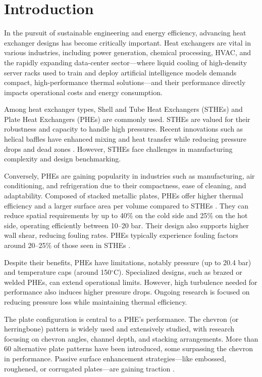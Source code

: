 \documentclass[review,12pt]{elsarticle}
\newcommand{\degree}{\ensuremath{^\circ}}
\begin{document}
\clearpage

\section{Introduction}
\label{sec:introduction}


In the pursuit of sustainable engineering and energy efficiency, advancing heat exchanger designs has become critically important. Heat exchangers are vital in various industries, including power generation, chemical processing, HVAC, and the rapidly expanding data-center sector---where liquid cooling of high-density server racks used to train and deploy artificial intelligence models demands compact, high-performance thermal solutions---and their performance directly impacts operational costs and energy consumption. 

Among heat exchanger types, Shell and Tube Heat Exchangers (STHEs) and Plate Heat Exchangers (PHEs) are commonly used. STHEs are valued for their robustness and capacity to handle high pressures. Recent innovations such as helical baffles have enhanced mixing and heat transfer while reducing pressure drops and dead zones \citep{salahuddin2015}. However, STHEs face challenges in manufacturing complexity and design benchmarking.

Conversely, PHEs are gaining popularity in industries such as manufacturing, air conditioning, and refrigeration due to their compactness, ease of cleaning, and adaptability. Composed of stacked metallic plates, PHEs offer higher thermal efficiency and a larger surface area per volume compared to STHEs \citep{abukhader2012}. They can reduce spatial requirements by up to 40\% on the cold side and 25\% on the hot side, operating efficiently between 10--20 bar. Their design also supports higher wall shear, reducing fouling rates. PHEs typically experience fouling factors around 20--25\% of those seen in STHEs \citep{thulukkanam2013}.

Despite their benefits, PHEs have limitations, notably pressure (up to 20.4 bar) and temperature caps (around 150\degree C). Specialized designs, such as brazed or welded PHEs, can extend operational limits. However, high turbulence needed for performance also induces higher pressure drops. Ongoing research is focused on reducing pressure loss while maintaining thermal efficiency.

The plate configuration is central to a PHE's performance. The chevron (or herringbone) pattern is widely used and extensively studied, with research focusing on chevron angles, channel depth, and stacking arrangements. More than 60 alternative plate patterns have been introduced, some surpassing the chevron in performance. Passive surface enhancement strategies---like embossed, roughened, or corrugated plates---are gaining traction \citep{zhang2019a}.
\end{document}
